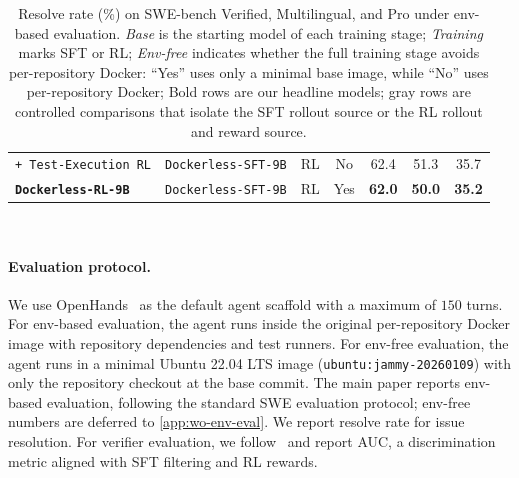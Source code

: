 \documentclass{llmxive}
\providecommand{\approach}{Dockerless\xspace}
\begin{document}
\begin{table}[t]
{\begin{tabular}{l l l c ccc}
\texttt{+\,Test-Execution RL}
                                & \texttt{\approach-SFT-9B}            & RL     & No               & 62.4 & 51.3 & 35.7 \\
\rowcolor{black!4}
\textbf{\texttt{\approach-RL-9B}}  & \texttt{\approach-SFT-9B}         & RL     & Yes     & \textbf{62.0} & \textbf{50.0} & \textbf{35.2} \\
\bottomrule
\end{tabular}%
}
\\[2pt]
\caption{
Resolve rate (\%) on SWE-bench Verified, Multilingual, and Pro under env-based evaluation.
\emph{Base} is the starting model of each training stage; 
\emph{Training} marks SFT or RL; 
\emph{Env-free} indicates whether the full training stage avoids per-repository Docker: ``Yes'' uses only a minimal base image, while ``No'' uses per-repository Docker;
Bold rows are our headline models; gray rows are controlled comparisons that isolate the SFT rollout source or the RL rollout and reward source.
}
\label{tab:main}
\end{table}


\paragraph{Evaluation protocol.}
We use OpenHands~\citep{wang2025openhands} as the default agent scaffold with a maximum of $150$ turns.
For env-based evaluation, the agent runs inside the original per-repository Docker image with repository dependencies and test runners.
For env-free evaluation, the agent runs in a minimal Ubuntu 22.04 LTS image (\texttt{ubuntu:jammy-20260109}) with only the repository checkout at the base commit.
The main paper reports env-based evaluation, following the standard SWE evaluation protocol; env-free numbers are deferred to \cref{app:wo-env-eval}.
We report resolve rate for issue resolution.
For verifier evaluation, we follow~\citep{shum2025swe} and report AUC, a discrimination metric aligned with SFT filtering and RL rewards.
\end{document}
